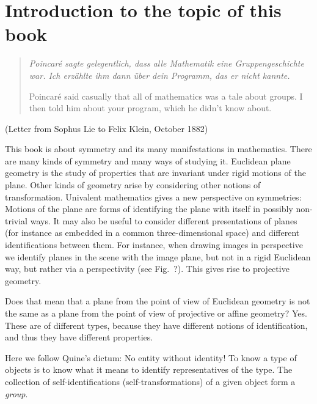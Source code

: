 \chapter{Introduction to the topic of this book}
\label{ch:intro}

\begin{quote}
  \itshape Poincar\'e sagte gelegentlich,
  dass alle Mathematik eine Gruppengeschichte war.
  Ich erz\"ahlte ihm dann \"uber dein Programm,
  das er nicht kannte.

  \smallskip

  \noindent Poincar\'e said casually
  that all of mathematics was a tale about groups.
  I then told him about your program,
  which he didn't know about.
\end{quote}
\hfill (Letter from Sophus Lie to Felix Klein, October 1882)

\bigskip


This book is about symmetry and its many manifestations in mathematics.
There are many kinds of symmetry and many ways of studying it.
Euclidean plane geometry is the study of properties that are invariant under rigid motions of the plane.
Other kinds of geometry arise by considering other notions of transformation.
Univalent mathematics gives a new perspective on symmetries:
Motions of the plane are forms of identifying the plane with itself in possibly non-trivial ways.
It may also be useful to consider different presentations of planes
(for instance as embedded in a common three-dimensional space)
and different identifications between them.
For instance, when drawing images in perspective
we identify planes in the scene with the image plane,
but not in a rigid Euclidean way, but
rather via a perspectivity (see Fig.~?).
This gives rise to projective geometry.

Does that mean that a plane from the point of view of Euclidean
geometry is not the same as a plane from the point of view of
projective or affine geometry?
Yes.
These are of different types,
because they have different notions of identification,
and thus they have different properties.

Here we follow Quine's dictum: No entity without identity!
To know a type of objects is to know what it means to identify representatives of the type.
The collection of self-identifications (self-transformations) of a given object form a \emph{group}.

